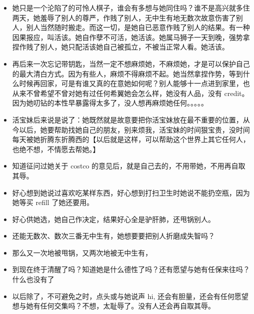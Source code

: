 \documentclass[9pt, b5paper]{article}
\begin{document}
\begin{itemize}
\item 她只是一个沦陷了的可怜人棋子，谁会有多想与她同住吗？谁不是高兴就多住两天，她羞辱了别人的尊严，作贱了别人，无中生有地无数次故意伤害了别人，别人当然随时搬走。而这一切，是她自已恶意作贱了别人的结果。有一种因果报应，叫活该。她自作孽不可活，她活该。她属马狮子一天到晚，强势拿捏作贱了别人，她只配活该她自己被孤立，不被当正常人看。她活该。

\item 再后来一次忘记带钥匙，当然一定不想麻烦她，不麻烦她，才是可以保护自己的最大清白方式。因为有些人，麻烦不得麻烦不起。她当然拿捏作势，等到什么时候再回家，可是有谁又真的在意她如何呢？别人能够十一点进到家里，也从来不曾希望不曾对她有过任何希翼她会怎么样，她没有人品，没有 credit。因为她叨钻的本性早暴露得太多了，没人想再麻烦她任何。。。。。

\item 活宝妹后来说是说了：她既然就是故意要把你活宝妹放在最不重要的位置，从今以后，她要帮助找她自己的朋友，别来烦我，活宝妹的时间狠宝贵，没时间每天被她折腾东折腾西的【以后就是这样，可以帮助这个世界上其它任何人，也绝不想，不情愿去帮她。】

\item 知道征问过她关于 costco 的意见后，就是自己去的，不用带她，不用再自取其辱。

\item 好心想到她说过喜欢吃某样东西，好心想到打扫卫生时她说不能扔空瓶，因为她等买 refill 了她还要用。
\item 好心供她选，她自己作决定，结果好心全是驴肝肺，还甩锅别人。
\item 还能无数次、数次三番无中生有，她想要要把别人折磨成失智吗？
\item 那么又一次地被甩锅，又两次地被无中生有，
\item 到现在终于清醒了吗？知道她是什么德性了吗？还有愿望与她有任保来往吗？什么也没有了

\item 以后除了，不可避免之时，点头或与她说声 hi, 还会有胆量，还会有任何愿望想与她有任何交集吗？不想，太耻辱了。没有人还会再自取其辱。


\end{itemize}
\end{document}
